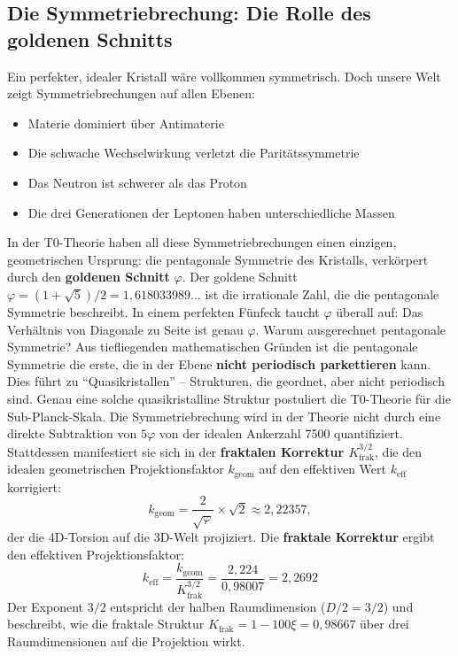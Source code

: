 	\subsection{Die Symmetriebrechung: Die Rolle des goldenen Schnitts}
	Ein perfekter, idealer Kristall wäre vollkommen symmetrisch. Doch unsere Welt zeigt Symmetriebrechungen auf allen Ebenen:
	\begin{itemize}
		\item Materie dominiert über Antimaterie
		\item Die schwache Wechselwirkung verletzt die Paritätssymmetrie
		\item Das Neutron ist schwerer als das Proton
		\item Die drei Generationen der Leptonen haben unterschiedliche Massen
	\end{itemize}
	In der T0-Theorie haben all diese Symmetriebrechungen einen einzigen, geometrischen Ursprung: die pentagonale Symmetrie des Kristalls, verkörpert durch den \textbf{goldenen Schnitt} \(\varphi\).
	Der goldene Schnitt \(\varphi = (1+\sqrt{5})/2 = 1{,}618033989\ldots\) ist die irrationale Zahl, die die pentagonale Symmetrie beschreibt. In einem perfekten Fünfeck taucht \(\varphi\) überall auf: Das Verhältnis von Diagonale zu Seite ist genau \(\varphi\).
	Warum ausgerechnet pentagonale Symmetrie? Aus tiefliegenden mathematischen Gründen ist die pentagonale Symmetrie die erste, die in der Ebene \textbf{nicht periodisch parkettieren} kann. Dies führt zu \enquote{Quasikristallen} -- Strukturen, die geordnet, aber nicht periodisch sind. Genau eine solche quasikristalline Struktur postuliert die T0-Theorie für die Sub-Planck-Skala.
	Die Symmetriebrechung wird in der Theorie nicht durch eine direkte Subtraktion von \(5\varphi\) von der idealen Ankerzahl 7500 quantifiziert. Stattdessen manifestiert sie sich in der \textbf{fraktalen Korrektur $K_\text{frak}^{3/2}$}, die den idealen geometrischen Projektionsfaktor \(k_\text{geom}\) auf den effektiven Wert \(k_\text{eff}\) korrigiert:
	\begin{equation}
		k_\text{geom} = \frac{2}{\sqrt{\varphi}} \times \sqrt{2} \approx 2{,}22357,
	\end{equation}
	der die 4D-Torsion auf die 3D-Welt projiziert. Die \textbf{fraktale Korrektur} ergibt den effektiven Projektionsfaktor:
	\begin{equation}
		k_\text{eff} = \frac{k_\text{geom}}{K_\text{frak}^{3/2}} = \frac{2{,}224}{0{,}98007} = 2{,}2692
	\end{equation}
	Der Exponent $3/2$ entspricht der halben Raumdimension ($D/2 = 3/2$) und beschreibt, wie die fraktale Struktur $K_\text{frak} = 1 - 100\xi = 0{,}98667$ über drei Raumdimensionen auf die Projektion wirkt.
	
